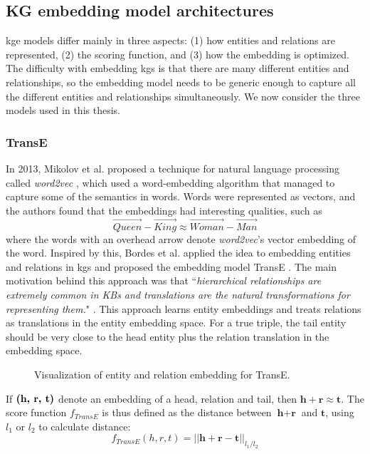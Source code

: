 \subsection{KG embedding model architectures}
\label{KG_embeddings_section}
\gls{kge} models differ mainly in three aspects: (1) how entities and relations are represented, (2) the scoring function, and (3) how the embedding is optimized. The difficulty with embedding \glspl{kg} is that there are many different entities and relationships, so the embedding model needs to be generic enough to capture all the different entities and relationships simultaneously. We now consider the three models used in this thesis.

\subsubsection{TransE}
\label{TransE_peaked_in_2013}
In 2013, Mikolov et al. proposed a technique for natural language processing called \textit{word2vec} \cite{mikolov2013distributed,mikolov2013efficient}, which used a word-embedding algorithm that managed to capture some of the semantics in words. Words were represented as vectors, and the authors found that the embeddings had interesting qualities, such as
\[\overrightarrow{Queen} - \overrightarrow{King} \approx \overrightarrow{Woman} -\overrightarrow{Man}\]
where the words with an overhead arrow denote \textit{word2vec}'s vector embedding of the word. Inspired by this, Bordes et al. applied the idea to embedding entities and relations in \glspl{kg} and proposed the embedding model TransE \cite{TransE}. The main motivation behind this approach was that ``\textit{hierarchical relationships are extremely common in KBs and translations are the natural transformations for representing them.}" \cite{TransE}. This approach learns entity embeddings and treats relations as translations in the entity embedding space.  For a true triple, the tail entity should be very close to the head entity plus the relation translation in the embedding space. 

\begin{figure}[htp]
    \centering
    
    \caption[TransE embedding.]{Visualization of entity and relation embedding for TransE.}
    \label{IKEA_TransE}
\end{figure}

If $\text{\textbf{(h, r, t)}}$ denote an embedding of a head, relation and tail, then $\textbf{h} + \textbf{r} \approx \textbf{t}$. The score function $f_{TransE}$ is thus defined as the distance between $\textbf{h} + \textbf{r}$ and $\textbf{t}$, using $l_1$ or $l_2$ to calculate distance:
\[f_{TransE}(h, r, t) = ||\textbf{h} + \textbf{r} - \textbf{t}||_{l_1/l_2}\]

